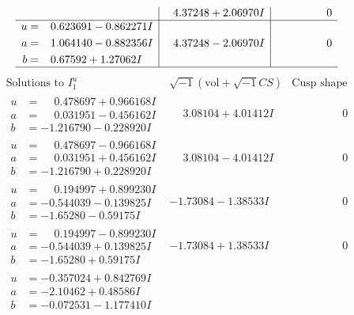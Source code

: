 \documentclass[1p]{elsarticle_modified}
\theoremstyle{definition}
\newcommand{\I}{\sqrt{-1}}
\begin{document}
$$\begin{array}{c|c|c}
 & \phantom{-}4.37248 + 2.06970 I & \phantom{-0.000000 } 0 \\ \hline\begin{aligned}
u &= \phantom{-}0.623691 - 0.862271 I \\
a &= \phantom{-}1.064140 - 0.882356 I \\
b &= \phantom{-}0.67592 + 1.27062 I\end{aligned}
 & \phantom{-}4.37248 - 2.06970 I & \phantom{-0.000000 } 0\\
 \hline 
 \end{array}$$\newpage$$\begin{array}{c|c|c}  
\text{Solutions to }I^u_{1}& \I (\text{vol} + \sqrt{-1}CS) & \text{Cusp shape}\\
 \hline 
\begin{aligned}
u &= \phantom{-}0.478697 + 0.966168 I \\
a &= \phantom{-}0.031951 - 0.456162 I \\
b &= -1.216790 - 0.228920 I\end{aligned}
 & \phantom{-}3.08104 + 4.01412 I & \phantom{-0.000000 } 0 \\ \hline\begin{aligned}
u &= \phantom{-}0.478697 - 0.966168 I \\
a &= \phantom{-}0.031951 + 0.456162 I \\
b &= -1.216790 + 0.228920 I\end{aligned}
 & \phantom{-}3.08104 - 4.01412 I & \phantom{-0.000000 } 0 \\ \hline\begin{aligned}
u &= \phantom{-}0.194997 + 0.899230 I \\
a &= -0.544039 - 0.139825 I \\
b &= -1.65280 - 0.59175 I\end{aligned}
 & -1.73084 - 1.38533 I & \phantom{-0.000000 } 0 \\ \hline\begin{aligned}
u &= \phantom{-}0.194997 - 0.899230 I \\
a &= -0.544039 + 0.139825 I \\
b &= -1.65280 + 0.59175 I\end{aligned}
 & -1.73084 + 1.38533 I & \phantom{-0.000000 } 0 \\ \hline\begin{aligned}
u &= -0.357024 + 0.842769 I \\
a &= -2.10462 + 0.48586 I \\
b &= -0.072531 - 1.177410 I\end{aligned}

\end{array}$$
\end{document}
